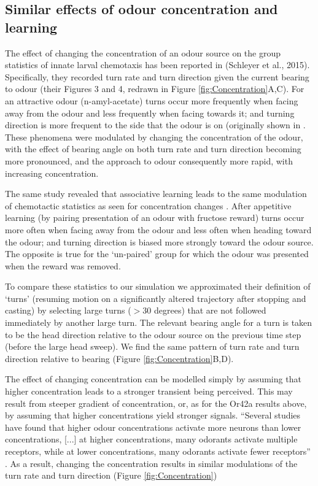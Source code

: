 \documentclass[11pt,a4paper]{article}
\begin{document}
\subsection{Similar effects of odour concentration and learning}
The effect of changing the concentration of an odour source on the group statistics of innate larval chemotaxis has been reported in (Schleyer et al., 2015). Specifically, they recorded turn rate and turn direction given the current bearing to odour (their Figures 3 and 4, redrawn in Figure \ref{fig:Concentration}A,C). For an attractive odour (n-amyl-acetate) turns occur more frequently when facing away from the odour and less frequently when facing towards it; and turning direction is more frequent to the side that the odour is on (originally shown in \citet{gomez2011active}. These phenomena were modulated by changing the concentration of the odour, with the effect of bearing angle on both turn rate and turn direction becoming more pronounced, and the approach to odour consequently more rapid, with increasing concentration.

The same \cite{schleyer2015learning} study revealed that associative learning leads to the same modulation of chemotactic statistics as seen for concentration changes \citep[][Figures 3 and 4]{schleyer2015learning}. After appetitive learning (by pairing presentation of an odour with fructose reward) turns occur more often when facing away from the odour and less often when heading toward the odour; and turning direction is biased more strongly toward the odour source. The opposite is true for the ‘un-paired’ group for which the odour was presented when the reward was removed. 


 To compare these statistics to our simulation we approximated their definition of ‘turns’ (resuming motion on a significantly altered trajectory after stopping and casting) by selecting large turns ($>30$ degrees) that are not followed immediately by another large turn. The relevant bearing angle for a turn is taken to be the head direction relative to the odour source on the previous time step (before the large head sweep). We find the same pattern of turn rate and turn direction relative to bearing (Figure \ref{fig:Concentration}B,D).

The effect of changing concentration can be modelled simply by assuming that higher concentration leads to a stronger transient being perceived. This may result from steeper gradient of concentration, or, as for the Or42a results above, by assuming that higher concentrations yield stronger signals.  “Several studies have found that higher odour concentrations activate more neurons than lower concentrations, [...] at higher concentrations, many odorants activate multiple receptors, while at lower concentrations, many odorants activate fewer receptors” \citep{hallem2006coding}.
 As a result, changing the concentration results in similar modulations of the turn rate and turn direction (Figure \ref{fig:Concentration})
\end{document}
